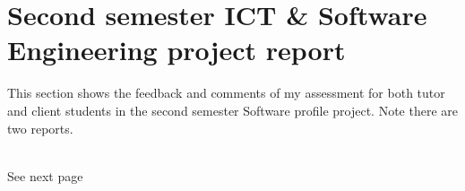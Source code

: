 \section{Second semester ICT \& Software Engineering project report}\label{appendices:research_assessing_project}
This section shows the feedback and comments of my assessment for both tutor and client students in the second semester Software profile project. Note there are two reports.\\\\
\begin{minipage}{0.5\textwidth}
\begin{flushleft}
\end{flushleft}
\end{minipage}
\hfill
\begin{minipage}{0.5\textwidth}
\begin{flushright}
   See next page
\end{flushright}
\end{minipage}


